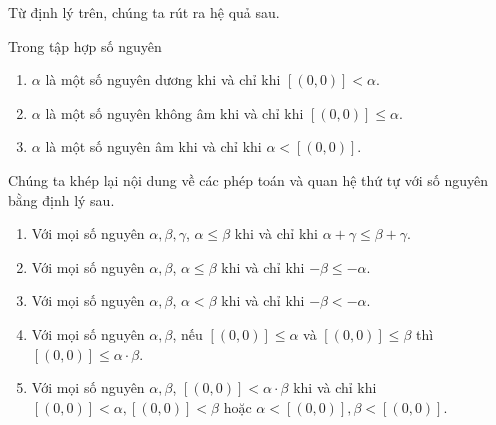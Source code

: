Từ định lý trên, chúng ta rút ra hệ quả sau.
\begin{corollary}\label{corollary:positive-nonnegative-negative-precise-condition}
	Trong tập hợp số nguyên
	\begin{enumerate}[label={(\roman*)}]
		\item $\alpha$ là một số nguyên dương khi và chỉ khi $[(0,0)] < \alpha$.
		\item $\alpha$ là một số nguyên không âm khi và chỉ khi $[(0,0)] \leq \alpha$.
		\item $\alpha$ là một số nguyên âm khi và chỉ khi $\alpha < [(0,0)]$.
	\end{enumerate}
\end{corollary}

Chúng ta khép lại nội dung về các phép toán và quan hệ thứ tự với số nguyên bằng định lý sau.

\begin{theorem}
	\begin{enumerate}[label={(\roman*)}]
		\item Với mọi số nguyên $\alpha, \beta, \gamma$, $\alpha\leq \beta$ khi và chỉ khi $\alpha + \gamma\leq \beta + \gamma$.
		\item Với mọi số nguyên $\alpha, \beta$, $\alpha\leq \beta$ khi và chỉ khi $-\beta\leq-\alpha$.
		\item Với mọi số nguyên $\alpha, \beta$, $\alpha < \beta$ khi và chỉ khi $-\beta < -\alpha$.
		\item Với mọi số nguyên $\alpha, \beta$, nếu $[(0,0)]\leq \alpha$ và $[(0,0)]\leq \beta$ thì $[(0,0)]\leq \alpha\cdot \beta$.
		\item Với mọi số nguyên $\alpha, \beta$, $[(0,0)] < \alpha\cdot \beta$ khi và chỉ khi $[(0,0)] < \alpha, [(0,0)] < \beta$ hoặc $\alpha < [(0,0)], \beta < [(0,0)]$.
	\end{enumerate}
\end{theorem}

